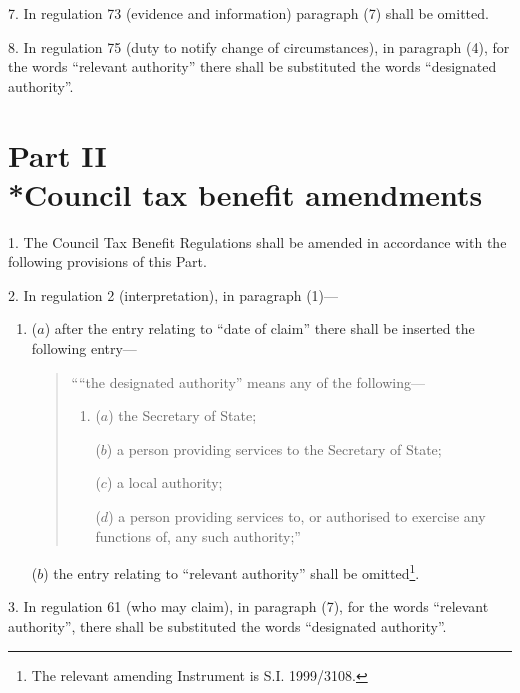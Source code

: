 \documentclass[12pt,a4paper]{article}
\begin{document}
\medskip

7.  In regulation 73 (evidence and information) paragraph (7) shall be omitted.

\medskip

8.  In regulation 75 (duty to notify change of circumstances), in paragraph (4), for the words “relevant authority” there shall be substituted the words “designated authority”.

\section[Part II --- Council tax benefit amendments]{Part II\\*Council tax benefit amendments}

\renewcommand\parthead{--- Schedule 4 Part II}

1.  The Council Tax Benefit Regulations shall be amended in accordance with the following provisions of this Part.

\medskip

2.  In regulation 2 (interpretation), in paragraph (1)—
\begin{enumerate}\item[]
($a$) after the entry relating to “date of claim” there shall be inserted the following entry—
\begin{quotation}
    ““the designated authority” means any of the following—
\begin{enumerate}\item[]
    ($a$) 
    the Secretary of State;

    ($b$) 
    a person providing services to the Secretary of State;

    ($c$) 
    a local authority;

    ($d$) 
    a person providing services to, or authorised to exercise any functions of, any such authority;” 
\end{enumerate}
\end{quotation}

($b$) the entry relating to “relevant authority” shall be omitted\footnote{\frenchspacing The relevant amending Instrument is S.I. 1999/3108.}.
\end{enumerate}

\medskip

3.  In regulation 61 (who may claim), in paragraph (7), for the words “relevant authority”, there shall be substituted the words “designated authority”.

\medskip
\end{document}
